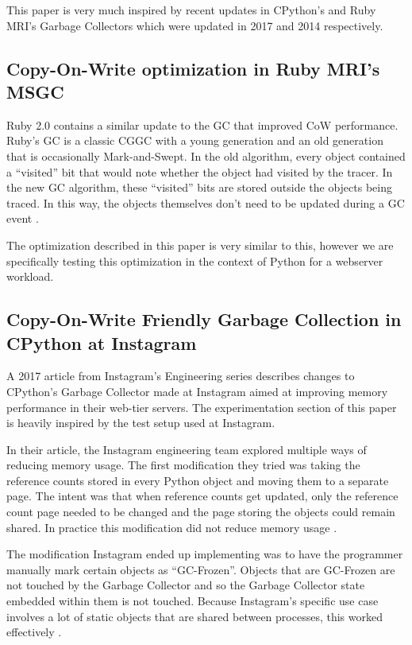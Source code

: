 \documentclass{article}
\begin{document}
\begin{sloppypar}
This paper is very much inspired by recent updates in CPython's and Ruby MRI's Garbage Collectors which were updated in 2017 and 2014 respectively.  

\subsection{Copy-On-Write optimization in Ruby MRI's MSGC}

Ruby 2.0 contains a similar update to the GC that improved CoW performance.  Ruby's GC is a classic CGGC with a young generation and an old generation that is occasionally Mark-and-Swept.  In the old algorithm, every object contained a ``visited'' bit that would note whether the object had visited by the tracer.  In the new GC algorithm, these ``visited'' bits are stored outside the objects being traced.  In this way, the objects themselves don't need to be updated during a GC event \cite{incremental_ruby}.  

The optimization described in this paper is very similar to this, however we are specifically testing this optimization in the context of Python for a webserver workload.  

\subsection{Copy-On-Write Friendly Garbage Collection in CPython at Instagram}

A 2017 article from Instagram's Engineering series describes changes to CPython's Garbage Collector made at Instagram aimed at improving memory performance in their web-tier servers.  The experimentation section of this paper is heavily inspired by the test setup used at Instagram.

In their article, the Instagram engineering team explored multiple ways of reducing memory usage.  The first modification they tried was taking the reference counts stored in every Python object and moving them to a separate page.  The intent was that when reference counts get updated, only the reference count page needed to be changed and the page storing the objects could remain shared.  In practice this modification did not reduce memory usage \cite{dismissing_garbage}.  

The modification Instagram ended up implementing was to have the programmer manually mark certain objects as ``GC-Frozen''.  Objects that are GC-Frozen are not touched by the Garbage Collector and so the Garbage Collector state embedded within them is not touched.  Because Instagram's specific use case involves a lot of static objects that are shared between processes, this worked effectively \cite{fixing_garbage}.  


\end{sloppypar}
\end{document}

